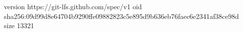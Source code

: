 version https://git-lfs.github.com/spec/v1
oid sha256:09d99d8e64704b9290ffe09882823c5e895d9b636eb76faec6e2341af38ce98d
size 13321
